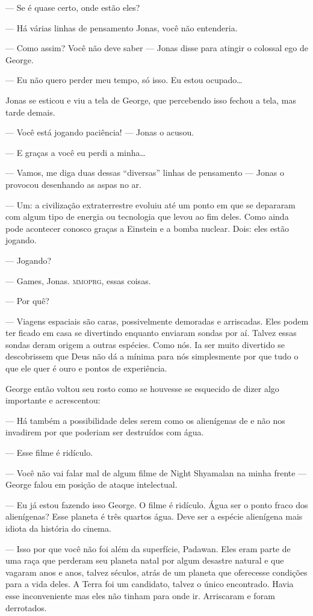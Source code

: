 --- Se é quase certo, onde estão eles?

--- Há várias linhas de pensamento Jonas, você não entenderia.

--- Como assim? Você não deve saber --- Jonas disse para atingir o colossal ego de George.

--- Eu não quero perder meu tempo, só isso. Eu estou ocupado\ldots

Jonas se esticou e viu a tela de George, que percebendo isso fechou a tela, mas tarde demais.

--- Você está jogando paciência! --- Jonas o acusou.

--- E graças a você eu perdi a minha\ldots

--- Vamos, me diga duas dessas ``diversas'' linhas de pensamento --- Jonas o provocou desenhando as aspas no ar.

--- Um: a civilização extraterrestre evoluiu até um ponto em que se depararam com algum tipo de energia ou tecnologia que levou ao fim deles. Como ainda pode acontecer conosco graças a Einstein e a bomba nuclear. Dois: eles estão jogando.

--- Jogando?

--- Games, Jonas. \textsc{mmoprg}, essas coisas.

--- Por quê?

--- Viagens espaciais são caras, possivelmente demoradas e arriscadas. Eles podem ter ficado em casa se divertindo enquanto enviaram sondas por aí. Talvez essas sondas deram origem a outras espécies. Como nós. Ia ser muito divertido se descobrissem que Deus não dá a mínima para nós simplesmente por que tudo o que ele quer é ouro e pontos de experiência.

George então voltou seu rosto como se houvesse se esquecido de dizer algo importante e acrescentou:

--- Há também a possibilidade deles serem como os alienígenas de  e não nos invadirem por que poderiam ser destruídos com água.

--- Esse filme é ridículo.

--- Você não vai falar mal de algum filme de Night Shyamalan na minha frente ---  George falou\mudanca{,} em posição de ataque intelectual.

--- Eu já estou fazendo isso George. O filme é ridículo. Água ser o ponto fraco dos alienígenas? Esse planeta é três quartos água. Deve ser a espécie alienígena mais idiota da história do cinema.

--- Isso por que você não foi além da superfície, Padawan. Eles eram parte de uma raça que perderam seu planeta natal por algum desastre natural e que vagaram anos e anos, talvez séculos, atrás de um planeta que oferecesse condições para a vida deles. A Terra foi um candidato, talvez o único encontrado. Havia esse inconveniente mas eles não tinham para onde ir. Arriscaram e foram derrotados.

